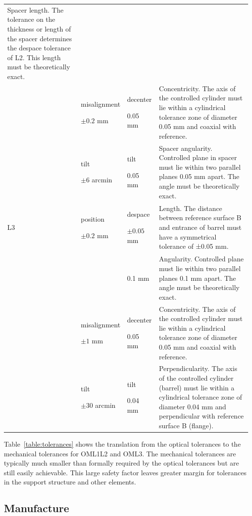\documentclass{article}
\begin{document}
\begin{table}
\begin{center}
\begin{tabular}{lp{2cm}p{2cm}p{6cm}}
Spacer length. The tolerance on the thickness or length of the spacer determines the despace tolerance of L2. This length must be theoretically exact.\\
&misalignment\par$\pm0.2$ mm&decenter\par0.05 mm&
Concentricity. The axis of the controlled cylinder must lie within a cylindrical tolerance zone of diameter 0.05 mm and coaxial with reference.\\
&tilt\par$\pm6$ arcmin&tilt\par0.05 mm&
Spacer angularity. Controlled plane in spacer must lie within two parallel planes 0.05 mm apart. The angle must be theoretically exact.\\
\hline
L3											
&position\par$\pm0.2$ mm&despace\par$\pm0.05$ mm&
Length. The distance between reference surface B and entrance of barrel must have a symmetrical tolerance of ±0.05 mm.\\
&&0.1 mm&
Angularity. Controlled plane must lie within two parallel planes 0.1 mm apart. The angle must be theoretically exact.\\
&misalignment\par$\pm1$ mm&decenter\par0.05 mm&
Concentricity. The axis of the controlled cylinder must lie within a cylindrical tolerance zone of diameter 0.05 mm and coaxial with reference.\\	
&tilt\par$\pm30$ arcmin&tilt\par0.04 mm&
Perpendicularity. The axis of the controlled cylinder (barrel) must lie within a cylindrical tolerance zone of diameter 0.04 mm and perpendicular with reference surface B (flange).\\
\hline
\end{tabular}
\end{center}
\end{table}

Table~\ref{table:tolerances} shows the translation from the optical tolerances to the mechanical tolerances for OML1L2 and OML3. The mechanical tolerances are typically much smaller than formally required by the optical tolerances but are still easily achievable. This large safety factor leaves greater margin for tolerances in the support structure and other elements.


\subsection{Manufacture}
\end{document}
